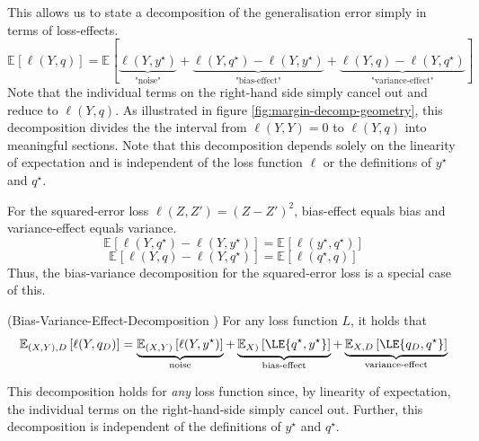 \documentclass[
	twoside=false, %
]{kaobook}
\begin{document}
This allows us to state a decomposition of the generalisation error simply in terms of loss-effects.
$$
\mathbb{E}_{}\left[ \ell(Y,q) \right]  = \mathbb{E}_{}\left[  \underbrace{ \ell(Y, y^\star) }_{\text{"noise"} }
+
\underbrace{ \ell(Y, q^\star) - \ell(Y, y^\star) }_{\text{"bias-effect"} }
+ 
\underbrace{ \ell(Y, q) - \ell(Y, q^\star) }_{\text{"variance-effect"} } \right]
$$
Note that the individual terms on the right-hand side simply cancel out and reduce to $\ell(Y, q)$. As illustrated in figure \ref{fig:margin-decomp-geometry}, this decomposition divides the the interval from $\ell(Y, Y) = 0$ to $\ell(Y, q)$ into meaningful sections. 
Note that this decomposition depends solely on the linearity of expectation and is independent of the loss function $\ell$ or the definitions of $y^\star$ and $q^\star$.

For the squared-error loss $\ell(Z, Z') = (Z - Z')^2$, bias-effect equals bias and variance-effect equals variance.
$$
 \mathbb{E}_{}\left[ \ell(Y, q^\star) - \ell(Y, y^\star) \right]  = \mathbb{E}_{}\left[ \ell(y^\star, q^\star) \right]
$$
$$
 \mathbb{E}_{}\left[ \ell(Y,q) - \ell(Y, q^\star) \right]  = \mathbb{E}_{}\left[ \ell(q^\star, q)  \right] 
$$
Thus, the bias-variance decomposition for the squared-error loss is a special case of this.

\begin{theorem} (Bias-Variance-Effect-Decomposition \cite{james_GeneralizationsBiasVariance_})
\label{thm:bias-variance-effect}
For any loss function $L$, it holds that
\begin{align*}
\mathbb{E}_{(X,Y), D}\left[ \ell(Y, q_{D}) \right]  
&= 
\underbrace{\mathbb{E}_{(X,Y)}\left[ \ell(Y, y^\star) \right]  }_{\text{noise}}
+ \underbrace{\mathbb{E}_{X)}\left[ \LE{q^\star, y^\star} \right] }_{\text{bias-effect}}
+ \underbrace{\mathbb{E}_{X,D}\left[ \LE{q_D, q^\star} \right] }_{\text{variance-effect}}  \\
\end{align*}
\end{theorem}
This decomposition holds for \textit{any} loss function since, by linearity of expectation, the individual terms on the right-hand-side simply cancel out. Further, this decomposition is independent of the definitions of $y^\star$ and $q^\star$.
\end{document}
